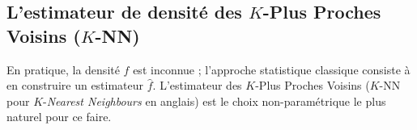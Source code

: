             
            


\subsection{L'estimateur de densité des $K$-Plus Proches Voisins ($K$-NN)}

En pratique, la densité $f$ est inconnue ; l'approche statistique classique consiste à en construire un estimateur $\widehat f$.
L'estimateur des $K$-Plus Proches Voisins ($K$-NN pour $K$-\emph{Nearest Neighbours} en anglais) \cite{BiauDevroye} est le choix non-paramétrique le plus naturel pour ce faire.

